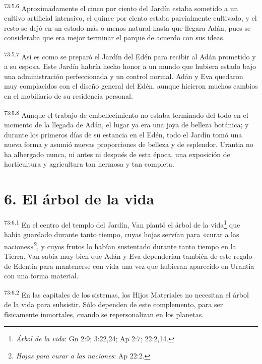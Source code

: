 \par
\textsuperscript{73:5.6} Aproximadamente el cinco por ciento del Jardín estaba sometido a un cultivo artificial intensivo, el quince por ciento estaba parcialmente cultivado, y el resto se dejó en un estado más o menos natural hasta que llegara Adán, pues se consideraba que era mejor terminar el parque de acuerdo con sus ideas.

\par
\textsuperscript{73:5.7} Así es como se preparó el Jardín del Edén para recibir al Adán prometido y a su esposa. Este Jardín habría hecho honor a un mundo que hubiera estado bajo una administración perfeccionada y un control normal. Adán y Eva quedaron muy complacidos con el diseño general del Edén, aunque hicieron muchos cambios en el mobiliario de su residencia personal.

\par
\textsuperscript{73:5.8} Aunque el trabajo de embellecimiento no estaba terminado del todo en el momento de la llegada de Adán, el lugar ya era una joya de belleza botánica; y durante los primeros días de su estancia en el Edén, todo el Jardín tomó una nueva forma y asumió nuevas proporciones de belleza y de esplendor. Urantia no ha albergado nunca, ni antes ni después de esta época, una exposición de horticultura y agricultura tan hermosa y tan completa.

\section*{6. El árbol de la vida}
\par
\textsuperscript{73:6.1} En el centro del templo del Jardín, Van plantó el árbol de la vida\footnote{\textit{Árbol de la vida}: Gn 2:9; 3:22,24; Ap 2:7; 22:2,14.} que había guardado durante tanto tiempo, cuyas hojas servían para «curar a las naciones»\footnote{\textit{Hojas para curar a las naciones}: Ap 22:2.}, y cuyos frutos lo habían sustentado durante tanto tiempo en la Tierra. Van sabía muy bien que Adán y Eva dependerían también de este regalo de Edentia para mantenerse con vida una vez que hubieran aparecido en Urantia con una forma material.

\par
\textsuperscript{73:6.2} En las capitales de los sistemas, los Hijos Materiales no necesitan el árbol de la vida para subsistir. Sólo dependen de este complemento, para ser físicamente inmortales, cuando se repersonalizan en los planetas.


